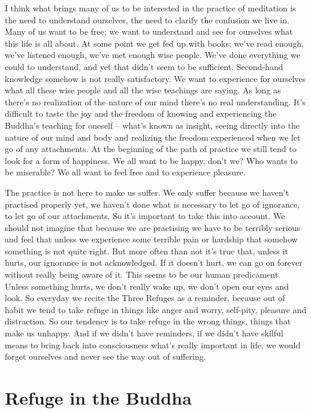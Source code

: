 I think what brings many of us to be interested in the practice of meditation is the need to understand ourselves, the need to clarify the confusion we live in. Many of us want to be free; we want to understand and see for ourselves what this life is all about. At some point we get fed up with books; we've read enough, we've listened enough, we've met enough wise people. We've done everything we could to understand, and yet that didn't seem to be sufficient. Second-hand knowledge somehow is not really satisfactory. We want to experience for ourselves what all these wise people and all the wise teachings are saying. As long as there's no realization of the nature of our mind there's no real understanding. It's difficult to taste the joy and the freedom of knowing and experiencing the Buddha's teaching for oneself -- what's known as insight, seeing directly into the nature of our mind and body and realizing the freedom experienced when we let go of any attachments. At the beginning of the path of practice we still tend to look for a form of happiness. We all want to be happy, don't we? Who wants to be miserable? We all want to feel free and to experience pleasure.

The practice is not here to make us suffer. We only suffer because we haven't practised properly yet, we haven't done what is necessary to let go of ignorance, to let go of our attachments. So it's important to take this into account. We should not imagine that because we are practising we have to be terribly serious and feel that unless we experience some terrible pain or hardship that somehow something is not quite right. But more often than not it's true that, unless it hurts, our ignorance is not acknowledged. If it doesn't hurt, we can go on forever without really being aware of it. This seems to be our human predicament. Unless something hurts, we don't really wake up, we don't open our eyes and look. So everyday we recite the Three Refuges as a reminder, because out of habit we tend to take refuge in things like anger and worry, self-pity, pleasure and distraction. So our tendency is to take refuge in the wrong things, things that make us unhappy. And if we didn't have reminders, if we didn't have skilful means to bring back into consciousness what's really important in life, we would forget ourselves and never see the way out of suffering.

\section*{Refuge in the Buddha}

